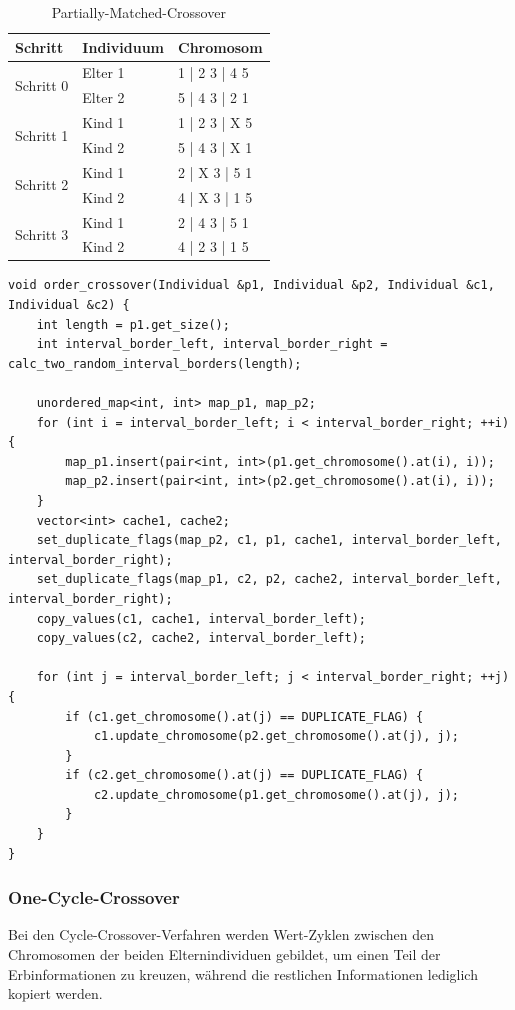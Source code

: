 \begin{table}[H]
\caption{Partially-Matched-Crossover}
\begin{tabularx}{\textwidth}{l|l|l}
Schritt & Individuum & Chromosom\\
\hline
\multirow{2}{*}{Schritt 0}
		& Elter 1 & 1 | 2 3 | 4 5\\
		& Elter 2 & 5 | 4 3 | 2 1\\
\hline
\multirow{2}{*}{Schritt 1}
		& Kind 1 & 1 | 2 3 | X 5\\
		& Kind 2 & 5 | 4 3 | X 1\\
\hline
\multirow{2}{*}{Schritt 2}
		& Kind 1 & 2 | X 3 | 5 1\\
		& Kind 2 & 4 | X 3 | 1 5\\
\hline
\multirow{2}{*}{Schritt 3}
		& Kind 1 & 2 | 4 3 | 5 1\\
		& Kind 2 & 4 | 2 3 | 1 5\\
\end{tabularx}
\label{tab:ox}
\end{table}


\begin{minipage}{\linewidth}
\begin{lstlisting}[caption={Order-Crossover}, firstnumber=1, captionpos=b, label=lst:ox]
void order_crossover(Individual &p1, Individual &p2, Individual &c1, Individual &c2) {
	int length = p1.get_size();
	int interval_border_left, interval_border_right = calc_two_random_interval_borders(length);

	unordered_map<int, int> map_p1, map_p2;
	for (int i = interval_border_left; i < interval_border_right; ++i) {
		map_p1.insert(pair<int, int>(p1.get_chromosome().at(i), i));
		map_p2.insert(pair<int, int>(p2.get_chromosome().at(i), i));
	}
	vector<int> cache1, cache2;
	set_duplicate_flags(map_p2, c1, p1, cache1, interval_border_left, interval_border_right);
	set_duplicate_flags(map_p1, c2, p2, cache2, interval_border_left, interval_border_right);
	copy_values(c1, cache1, interval_border_left);
	copy_values(c2, cache2, interval_border_left);

	for (int j = interval_border_left; j < interval_border_right; ++j) {
		if (c1.get_chromosome().at(j) == DUPLICATE_FLAG) {
			c1.update_chromosome(p2.get_chromosome().at(j), j);
		}
		if (c2.get_chromosome().at(j) == DUPLICATE_FLAG) {
			c2.update_chromosome(p1.get_chromosome().at(j), j);
		}
	}
}
\end{lstlisting}
\end{minipage}
\subsubsection{One-Cycle-Crossover}
Bei den Cycle-Crossover-Verfahren werden Wert-Zyklen zwischen den Chromosomen der beiden Elternindividuen gebildet, um einen Teil der Erbinformationen zu kreuzen, während die restlichen Informationen lediglich kopiert werden.

